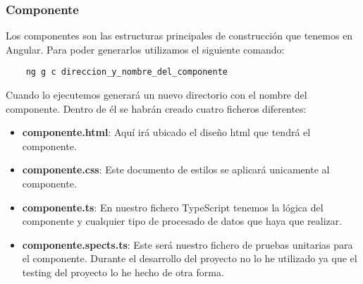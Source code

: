 \subsubsection{Componente}
Los componentes son las estructuras principales de construcción que tenemos en Angular. Para poder generarlos utilizamos el siguiente comando:
\begin{verbatim}
    ng g c direccion_y_nombre_del_componente
\end{verbatim}
Cuando lo ejecutemos generará un nuevo directorio con el nombre del componente. Dentro de él se habrán creado cuatro ficheros diferentes:
\begin{itemize}
    \item \textbf{componente.html}: Aquí irá ubicado el diseño html que tendrá el componente.
    \item \textbf{componente.css}: Este documento de estilos se aplicará unicamente al componente.
    \item \textbf{componente.ts}: En nuestro fichero TypeScript tenemos la lógica del componente y cualquier tipo de procesado de datos que haya que realizar.
    \item \textbf{componente.spects.ts}: Este será nuestro fichero de pruebas unitarias para el componente. Durante el desarrollo del proyecto no lo he utilizado ya que el testing del proyecto lo he hecho de otra forma.
\end{itemize}